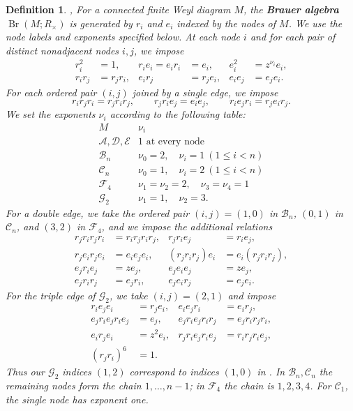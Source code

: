 \documentclass[11pt,a4paper]{amsart}
\newcommand{\Br}{\operatorname{Br}}\newcommand{\Irr}{\operatorname{Irr}}
\theoremstyle{uprightdefinition}
\newtheorem{definition}[theorem]{Definition}
\theoremstyle{remark}\newtheorem{remark}[theorem]{Remark}
\begin{document}
\begin{definition}
\label{def:weyl-brauer}
\cite[Section~1, Table~1]{CFW2009},
\cite[Definition~5.1, equations~(21)--(44)]{LiuG22015}
For a connected finite Weyl diagram $M$, the \textbf{Brauer algebra}
$\Br(M;R_\times)$ is generated by $r_i$ and $e_i$ indexed by the nodes of $M$.
We use the node labels and exponents specified below.
At each node $i$ and for each pair of distinct nonadjacent nodes $i,j$,
we impose
\begin{align*}
 r_i^2&=1,&r_ie_i=e_ir_i&=e_i,&e_i^2&=z^{\nu_i}e_i,\\
 r_ir_j&=r_jr_i,&e_ir_j&=r_je_i,&e_ie_j&=e_je_i.
\end{align*}
For each ordered pair $(i,j)$ joined by a single edge, we impose
\[
 r_ir_jr_i=r_jr_ir_j,\qquad
 r_jr_ie_j=e_ie_j,\qquad r_ie_jr_i=r_je_ir_j.
\]
We set the exponents $\nu_i$ according to the following table:
\[
\begin{array}{c|l}
 M&\nu_i\\\hline
 \mathscr{A},\mathscr{D},\mathscr{E}&1\text{ at every node}\\
 \mathscr{B}_n&\nu_0=2,\quad\nu_i=1\ (1\le i<n)\\
 \mathscr{C}_n&\nu_0=1,\quad\nu_i=2\ (1\le i<n)\\
 \mathscr{F}_4&\nu_1=\nu_2=2,\quad\nu_3=\nu_4=1\\
 \mathscr{G}_2&\nu_1=1,\quad\nu_2=3.
\end{array}
\]
For a double edge, we take the ordered pair
$(i,j)=(1,0)$ in $\mathscr{B}_n$, $(0,1)$ in $\mathscr{C}_n$, and $(3,2)$ in $\mathscr{F}_4$, and we impose
the additional relations
\begin{align*}
 r_jr_ir_jr_i&=r_ir_jr_ir_j,& r_jr_ie_j&=r_ie_j,\\
 r_je_ir_je_i&=e_ie_je_i,& (r_jr_ir_j)e_i&=e_i(r_jr_ir_j),\\
 e_jr_ie_j&=ze_j,& e_je_ie_j&=ze_j,\\
 e_jr_ir_j&=e_jr_i,&e_je_ir_j&=e_je_i.
\end{align*}
For the triple edge of $\mathscr{G}_2$, we take $(i,j)=(2,1)$ and impose
\begin{align*}
 r_ie_je_i&=r_je_i,&e_ie_jr_i&=e_ir_j,\\
 e_jr_ie_jr_ie_j&=e_j,&e_jr_ie_jr_ir_j&=e_jr_ir_jr_i,\\
 e_ir_je_i&=z^2e_i,&r_jr_ie_jr_ie_j&=r_ir_jr_ie_j,\\
 (r_jr_i)^6&=1.
\end{align*}
Thus our $\mathscr{G}_2$ indices $(1,2)$ correspond to indices $(1,0)$ in
\cite{LiuG22015}. In $\mathscr{B}_n,\mathscr{C}_n$ the remaining nodes form the chain
$1,\ldots,n-1$; in $\mathscr{F}_4$ the chain is $1,2,3,4$.
For $\mathscr{C}_1$, the single node has exponent one.
\end{definition}
\end{document}
